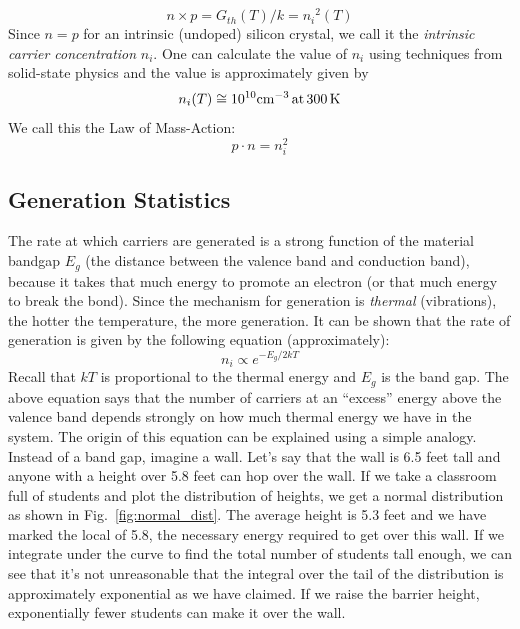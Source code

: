     \begin{equation}
        n \times p = {G_{th}}(T)/k = {n_i}^2(T)
    \end{equation}
Since $n=p$ for an intrinsic (undoped) silicon crystal, we call it the \emph{intrinsic carrier concentration} $n_i$.  One can calculate the value of $n_i$ using techniques from solid-state physics and the value is approximately given by 
    \begin{equation}
        {n_i}(T) \cong {10^{10}}{\rm{c}}{{\rm{m}}^{ - 3}}\,{\rm{at}}\,300\,{\rm{K}}
    \end{equation}
We call this the Law of Mass-Action:
    \begin{equation}
        p \cdot n = n_i^2
    \end{equation}
\subsection{Generation Statistics}
 The rate at which carriers are generated is a strong function of the material bandgap $E_g$ (the distance between the valence band and conduction band), because it takes that much energy to promote an electron (or that much energy to break the bond).  Since the mechanism for generation is \textit{thermal} (vibrations), the hotter the temperature, the more generation.    It can be shown that the rate of generation is given by the following equation (approximately):
    \begin{equation}
        n_i \propto e^{-E_g/2kT}
    \end{equation}
Recall that $kT$ is proportional to the thermal energy and  $E_g$ is the band gap.  The above equation says that the number of carriers at an “excess” energy above the valence band depends strongly on how much thermal energy we have in the system.  The origin of this equation can be explained using a simple analogy.  Instead of a band gap, imagine a wall.  Let’s say that the wall is 6.5 feet tall and anyone with a height over 5.8 feet can hop over the wall.  If we take a classroom full of students and plot the distribution of heights, we get a normal distribution as shown in Fig.~\ref{fig:normal_dist}.  The average height is 5.3 feet and we have marked the local of 5.8, the necessary energy required to get over this wall.  If we integrate under the curve to find the total number of students tall enough, we can see that it’s not unreasonable that the integral over the tail of the distribution is approximately exponential as we have claimed.  If we raise the barrier height, exponentially fewer students can make it over the wall.
